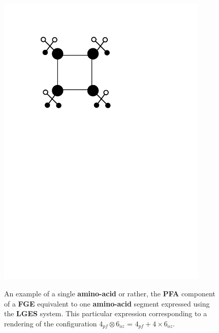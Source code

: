\documentclass[a4paper, 18pt]{book} %
\begin{document}
\begin{figure}[H]
  \begin{center}
   \includegraphics[trim=3cm 18cm 8cm 3cm, clip, width=0.9\textwidth,]{resources/pdfs/EXAPLATONICFORM-PFA.pdf}\\
   \caption{An example of a single \textbf{amino-acid} or rather, the \textbf{PFA} component of a \textbf{FGE} equivalent to one \textbf{amino-acid} segment expressed using the \textbf{LGES} system. This particular expression corresponding to a rendering of the configuration \textbf{$4_{pf} \otimes 6_{oz}$} = \textbf{$4_{pf} + 4 \times 6_{oz}$}.}
  \label{FIGEXAPLATONICFORMPFA}
  \end{center}
\end{figure}
\end{document}
